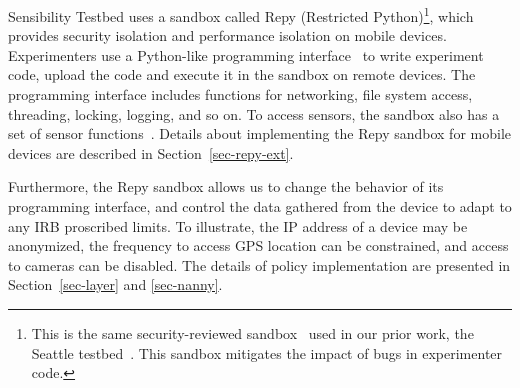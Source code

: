 Sensibility Testbed uses a sandbox called Repy (Restricted 
Python)\footnote{\scriptsize This is the 
same security-reviewed sandbox~\cite{cappos2010retaining} used in
our prior work, the Seattle testbed~\cite{seattle}. This sandbox
mitigates the impact of bugs in experimenter code.}, which 
provides security isolation and performance isolation on mobile devices.
Experimenters use a Python-like programming interface~\cite{repyv2}
to write experiment code, upload the code and execute it in the
sandbox on remote devices. The programming interface includes functions for networking, 
file system access, threading, locking, logging, and so on. To access sensors, 
the sandbox also has a set of sensor functions~\cite{sensors}. 
Details about implementing the Repy sandbox for mobile 
devices are described in Section~\ref{sec-repy-ext}.

Furthermore, the Repy sandbox allows us to change the 
behavior of its programming interface, and control the 
data gathered from the device to adapt to any IRB proscribed limits. 
To illustrate, the IP address of a device may be anonymized, 
the frequency to access GPS location can be constrained, and 
access to cameras can be disabled. 
The details of policy implementation are presented in 
Section~\ref{sec-layer} and \ref{sec-nanny}.

